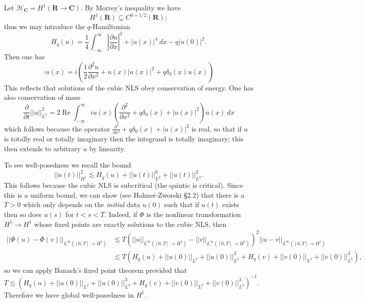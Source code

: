\documentclass[reqno,12pt,letterpaper]{amsart}
\newcommand{\RR}{\mathbf{R}}
\newcommand{\CC}{\mathbf{C}}
\renewcommand{\Re}{\operatorname{Re}}
\theoremstyle{definition}
\begin{document}
Let $\mathcal H_\CC = H^1(\RR \to \CC)$. By Morrey's inequality we have
$$H^1(\RR) \subseteq C^{0+1/2}(\RR);$$
thus we may introduce the $q$-Hamiltonian
$$H_q(u) = \frac{1}{4} \int_{-\infty}^\infty \left|\frac{\partial u}{\partial x}\right|^2 + |u(x)|^4 ~dx - q|u(0)|^2.$$
Then one has
$$\cdot u(x) = i\left(\frac{1}{2} \frac{\partial^2 u}{\partial x^2} + u(x)|u(x)|^2 + q\delta_0(x)u(x)\right)$$
This reflects that solutions of the cubic NLS obey conservation of energy.
One has also conservation of mass
$$\frac{\partial}{\partial t} ||u||_{L^2}^2 = 2 \Re \int_{-\infty}^\infty iu(x) \left(\frac{\partial^2}{\partial x^2} + q\delta_0(x) + |u(x)|^2\right)\overline u(x) ~dx$$
which follows because the operator $\frac{\partial^2}{\partial x^2} + q\delta_0(x) + |u(x)|^2$ is real, so that if $u$ is totally real or totally imaginary then the integrand is totally imaginary; this then extends to arbitrary $u$ by linearity.

To see well-posedness we recall the bound
$$||u(t)||_{H^1}^2 \lesssim H_q(u) + ||u(t)||_{L^2}^6 + ||u(t)||_{L^2}^2.$$
This follows because the cubic NLS is subcritical (the quintic is critical).
Since this is a uniform bound, we can show (see Holmer-Zworski \S2.2) that there is a $T > 0$ which only depends on the \emph{initial} data $u(0)$ such that if $u(t)$ exists then so does $u(s)$ for $t < s < T$.
Indeed, if $\Phi$ is the nonlinear transformation $H^1 \to H^1$ whose fixed points are exactly solutions to the cubic NLS, then
\begin{align*}
||\Phi(u) - \Phi(v)||_{L^\infty([0, T] \to H^1)} &\lesssim T(||u||_{L^\infty([0, T] \to H^1)} - ||v||_{L^\infty([0, T] \to H^1)})^2 ||u - v||_{L^\infty([0, T] \to H^1)} \\
&\lesssim T(H_q(u) + ||u(0)||_{L^2} + ||u(0)||_{L^2}^3 + H_q(v) + ||v(0)||_{L^2} + ||v(0)||_{L^2}^3),
\end{align*}
so we can apply Banach's fixed point theorem provided that
$$T \lesssim (H_q(u) + ||u(0)||_{L^2} + ||u(0)||_{L^2}^3 + H_q(v) + ||v(0)||_{L^2} + ||v(0)||_{L^2}^3)^{-1}.$$
Therefore we have global well-posedness in $H^1$.
\end{document}
